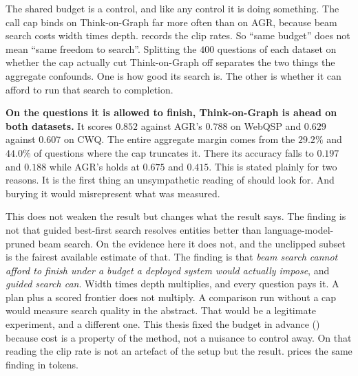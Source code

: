 The shared budget is a control, and like any control it is doing something.
The call cap binds on Think-on-Graph far more often than
on AGR, because beam search costs width times depth. 
records the clip rates. So ``same budget'' does not mean ``same freedom to
search''. Splitting the $400$ questions of each dataset on whether the cap
actually cut Think-on-Graph off separates the two things the aggregate
confounds. One is how good its search is. The other is whether it can afford to
run that search to completion.

\begin{table}[!tb]
  \begin{center}
    \caption[The agentic-baseline comparison, split on budget clipping]{The
    comparison against the agentic baseline, split on whether the shared
    $25$-call cap cut it short. Clipping is read from the per-record
    \textsf{budget\_exhausted} trace flag, not from a call count, because a run
    may spend its last permitted call on the step that finishes it. The
    \emph{combined} rows reproduce the Hits@1 column of ,
    recomputed independently from the raw records. Generated from
    \textsf{results/phase4/thesis\_numbers.json}.}
    \label{tab:tog-split}
    \small
    
  \end{center}
\end{table}

\textbf{On the questions it is allowed to finish, Think-on-Graph is ahead on
both datasets.} It scores $0.852$ against AGR's $0.788$ on WebQSP and $0.629$
against $0.607$ on CWQ. The entire aggregate margin comes from the $29.2\%$ and
$44.0\%$ of questions where the cap truncates it. There its accuracy falls to
$0.197$ and $0.188$ while AGR's holds at $0.675$ and $0.415$. This is stated
plainly for two reasons. It is the first thing an unsympathetic reading of
 should look for. And burying it would misrepresent what was
measured.

This does not weaken the result but changes what the result says. The finding is
not that guided best-first search resolves entities better than
language-model-pruned beam search. On the evidence here it does not, and the
unclipped subset is the fairest available estimate of that. The finding is that
\emph{beam search cannot afford to finish under a budget a deployed system would
actually impose}, and \emph{guided search can}. Width times depth multiplies,
and every question pays it. A plan plus a scored frontier does not multiply. A
comparison run without a cap would measure search quality in the abstract. That
would be a legitimate experiment, and a different one. This thesis fixed the
budget in advance () because cost is a property of the
method, not a nuisance to control away. On that reading the clip rate is not an
artefact of the setup but the result.  prices the same
finding in tokens.


